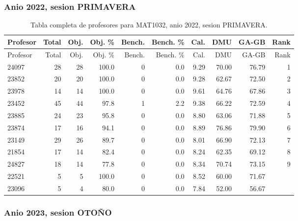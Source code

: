 \subsubsection{Anio 2022, sesion PRIMAVERA}

\begingroup
\scriptsize
\setlength{\tabcolsep}{3pt}
\begin{longtable}{lrrrrrrrrr}
\caption{Tabla completa de profesores para MAT1032, anio 2022, sesion PRIMAVERA.}\label{tab:prof-period-mat1032-2022-primavera}\\
\toprule
Profesor & Total & Obj. & Obj. \% & Bench. & Bench. \% & Cal. & DMU & GA-GB & Rank \\
\midrule
\endfirsthead
\toprule
Profesor & Total & Obj. & Obj. \% & Bench. & Bench. \% & Cal. & DMU & GA-GB & Rank \\
\midrule
\endhead
24097 & 28 & 28 & 100.0 & 0 & 0.0 & 9.29 & 70.00 & 76.79 & 1 \\
23852 & 20 & 20 & 100.0 & 0 & 0.0 & 9.28 & 62.67 & 72.50 & 2 \\
23978 & 14 & 14 & 100.0 & 0 & 0.0 & 9.61 & 64.76 & 67.86 & 3 \\
23452 & 45 & 44 & 97.8 & 1 & 2.2 & 9.38 & 66.22 & 72.59 & 4 \\
23885 & 24 & 23 & 95.8 & 0 & 0.0 & 8.80 & 63.06 & 71.88 & 5 \\
23874 & 17 & 16 & 94.1 & 0 & 0.0 & 8.89 & 76.86 & 79.90 & 6 \\
23149 & 29 & 26 & 89.7 & 0 & 0.0 & 8.01 & 66.90 & 72.13 & 7 \\
21854 & 17 & 14 & 82.4 & 0 & 0.0 & 8.24 & 62.35 & 69.12 & 8 \\
24827 & 18 & 14 & 77.8 & 0 & 0.0 & 8.34 & 70.74 & 73.15 & 9 \\
22521 & 5 & 5 & 100.0 & 0 & 0.0 & 8.52 & 60.00 & 71.67 &  \\
23096 & 5 & 4 & 80.0 & 0 & 0.0 & 7.84 & 52.00 & 56.67 &  \\
\bottomrule
\end{longtable}
\endgroup

\subsubsection{Anio 2023, sesion OTOÑO}

